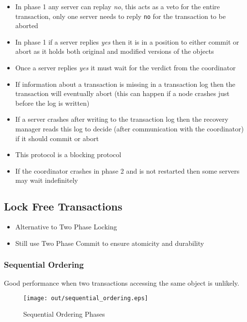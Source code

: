 \documentclass[a4paper]{article}
\begin{document}

\begin{itemize}
  \item In phase 1 any server can replay \textit{no}, this acts as a veto for
        the entire transaction, only one server needs to reply \texttt{no} for
        the transaction to be aborted
  \item In phase 1 if a server replies \textit{yes} then it is in a position
        to either commit or abort as it holds both original and modified
        versions of the objects
  \item Once a server replies \textit{yes} it must wait for the verdict from
        the coordinator
  \item If information about a transaction is missing in a transaction log then
        the transaction will eventually abort (this can happen if a node crashes
        just before the log is written)
  \item If a server crashes after writing to the transaction log then the
        recovery manager reads this log to decide (after communication with the
        coordinator) if it should commit or abort
  \item This protocol is a blocking protocol
  \item If the coordinator crashes in phase 2 and is not restarted then some
        servers may wait indefinitely
\end{itemize}

\subsection{Lock Free Transactions}

\begin{itemize}
  \item Alternative to Two Phase Locking
  \item Still use Two Phase Commit to ensure atomicity and durability
\end{itemize}

\subsubsection{Sequential Ordering}

Good performance when two transactions accessing the same object is unlikely.

\begin{figure}[h!]
  \centering
  \texttt{[image: out/sequential\_ordering.eps]}
  \caption{Sequential Ordering Phases}
  \label{fig:sequential_ordering}
\end{figure}
\FloatBarrier
\end{document}
